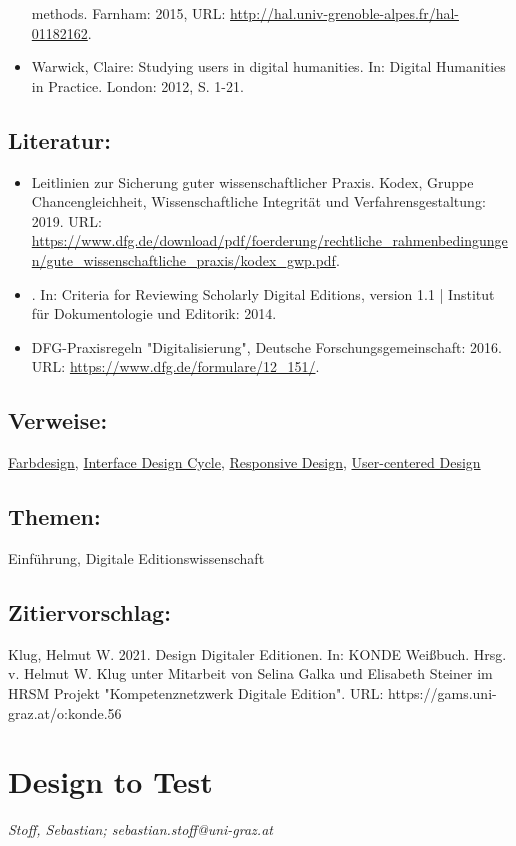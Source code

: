 \documentclass{article}
\begin{document}
\begin{itemize}
                              methods. Farnham: 2015, URL: \url{http://hal.univ-grenoble-alpes.fr/hal-01182162}.\item Warwick, Claire: Studying users in digital humanities. In: Digital Humanities in Practice. London: 2012, S. 1-21.\end{itemize}\subsection*{Literatur:}\begin{itemize}\item Leitlinien zur Sicherung guter wissenschaftlicher
                              Praxis. Kodex, Gruppe Chancengleichheit, Wissenschaftliche Integrität und
                                 Verfahrensgestaltung: 2019. URL: \url{https://www.dfg.de/download/pdf/foerderung/rechtliche_rahmenbedingungen/gute_wissenschaftliche_praxis/kodex_gwp.pdf}.\item . In: Criteria for Reviewing Scholarly Digital Editions,
                              version 1.1 | Institut für Dokumentologie und Editorik: 2014.\item DFG-Praxisregeln "Digitalisierung", Deutsche Forschungsgemeinschaft: 2016. URL: \url{https://www.dfg.de/formulare/12_151/}.\end{itemize}\subsection*{Verweise:}\href{https://gams.uni-graz.at/o:konde.84}{Farbdesign}, \href{https://gams.uni-graz.at/o:konde.99}{Interface Design Cycle}, \href{https://gams.uni-graz.at/o:konde.164}{Responsive Design}, \href{https://gams.uni-graz.at/o:konde.207}{User-centered Design}\subsection*{Themen:}Einführung, Digitale Editionswissenschaft\subsection*{Zitiervorschlag:}Klug, Helmut W. 2021. Design Digitaler Editionen. In: KONDE Weißbuch. Hrsg. v. Helmut W. Klug unter Mitarbeit von Selina Galka und Elisabeth Steiner im HRSM Projekt "Kompetenznetzwerk Digitale Edition". URL: https://gams.uni-graz.at/o:konde.56\newpage\section*{Design to Test} \emph{Stoff, Sebastian; sebastian.stoff@uni-graz.at }\\
        
\end{document}
